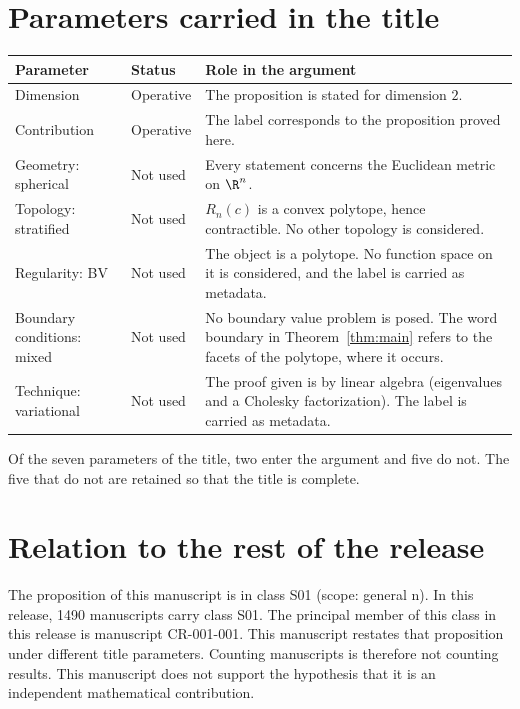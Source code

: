 \documentclass[11pt]{article}
\begin{document}
\section{Parameters carried in the title}\label{sec:params}
\begin{center}
\small
\begin{tabular}{p{}p{}p{}}
\toprule
Parameter & Status & Role in the argument \\
\midrule
Dimension & Operative & The proposition is stated for dimension $2$. \\
Contribution & Operative & The label corresponds to the proposition proved here. \\
Geometry: spherical & Not used & Every statement concerns the Euclidean metric on $\R^n$. \\
Topology: stratified & Not used & $R_n(c)$ is a convex polytope, hence contractible. No other topology is considered. \\
Regularity: BV & Not used & The object is a polytope. No function space on it is considered, and the label is carried as metadata. \\
Boundary conditions: mixed & Not used & No boundary value problem is posed. The word boundary in Theorem~\ref{thm:main} refers to the facets of the polytope, where it occurs. \\
Technique: variational & Not used & The proof given is by linear algebra (eigenvalues and a Cholesky factorization). The label is carried as metadata. \\
\bottomrule
\end{tabular}
\end{center}
Of the seven parameters of the title, two enter the argument and five do not. The five that do not are retained so that the title is complete.

\section{Relation to the rest of the release}
The proposition of this manuscript is in class S01 (scope: general n).
In this release, 1490 manuscripts carry class S01. The principal member of this class in this release is manuscript CR-001-001. This manuscript restates that proposition under different title parameters.
Counting manuscripts is therefore not counting results. This manuscript does not support the hypothesis that it is an independent mathematical contribution.
\end{document}
